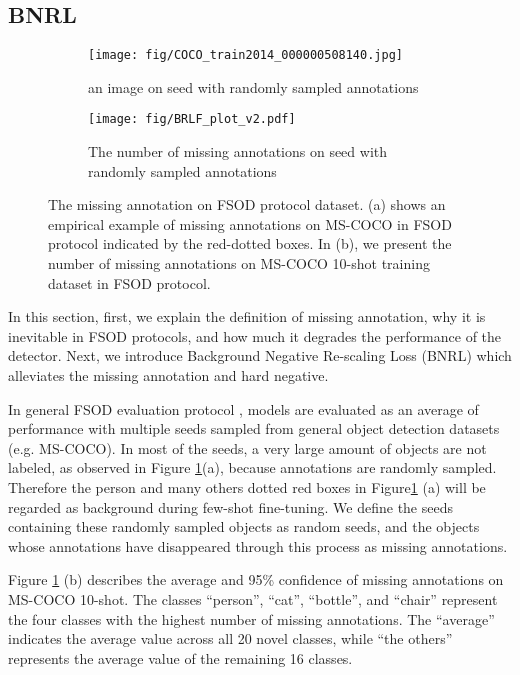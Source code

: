 \documentclass{article}
\begin{document}
\subsection{BNRL}
\begin{figure}[ht]
    \centering
    \begin{subfigure}[]{0.45\textwidth}
    \texttt{[image: fig/COCO\_train2014\_000000508140.jpg]}
    \caption{an image on seed with randomly sampled annotations}
    \end{subfigure}
    \begin{subfigure}[]{0.48\textwidth}
\texttt{[image: fig/BRLF\_plot\_v2.pdf]}
    \caption{The number of missing annotations on seed with randomly sampled annotations}
    \end{subfigure}
\caption{
The missing annotation on FSOD protocol dataset. 
(a) shows an empirical example of missing annotations on MS-COCO in FSOD protocol indicated by the red-dotted boxes.
In (b), we present the number of missing annotations on MS-COCO 10-shot training dataset in FSOD protocol.}
    \label{fig:negative sample1}
\end{figure}
In this section, first, we explain the definition of missing annotation, why it is inevitable in FSOD protocols, and how much it degrades the performance of the detector.
Next, we introduce Background Negative Re-scaling Loss (BNRL) which alleviates the missing annotation and hard negative.

In general FSOD evaluation protocol \cite{tfa}, models are evaluated as an average of performance with multiple seeds sampled from general object detection datasets (e.g. MS-COCO).
In most of the seeds, a very large amount of objects are not labeled, as observed in Figure \ref{fig:negative sample1}(a), because annotations are randomly sampled.
Therefore the person and many others dotted red boxes in Figure\ref{fig:negative sample1} (a) will be regarded as background during few-shot fine-tuning.
We define the seeds containing these randomly sampled objects as random seeds, and the objects whose annotations have disappeared through this process as missing annotations.

Figure \ref{fig:negative sample1} (b) describes the average and 95\% confidence of missing annotations on MS-COCO 10-shot.
The classes ``person'', ``cat'', ``bottle'', and ``chair'' represent the four classes with the highest number of missing annotations. The ``average'' indicates the average value across all 20 novel classes, while ``the others'' represents the average value of the remaining 16 classes.
\end{document}
